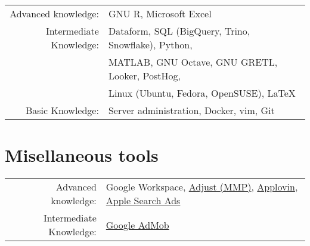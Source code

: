 \documentclass[a4paper,10pt]{article} %
\begin{document}
\begin{tabular}{rl}
    Advanced knowledge: & GNU R, Microsoft Excel\\
    Intermediate Knowledge: & Dataform, SQL (BigQuery, Trino, Snowflake), Python,
    \\&MATLAB, GNU Octave, GNU GRETL, Looker, PostHog,
    \\&Linux (Ubuntu, Fedora, OpenSUSE), \LaTeX\\
    Basic Knowledge: & Server administration, Docker, vim, Git\\
\end{tabular}

%
%
%

\section{Misellaneous tools}

\begin{tabular}{rl}
    Advanced knowledge: & Google Workspace,
    \href{https://www.adjust.com}{Adjust (MMP)},
    \href{https://www.applovin.com}{Applovin},
    \href{https://searchads.apple.com}{Apple Search Ads} \\
    Intermediate Knowledge: & \href{https://admob.google.com}{Google AdMob}
\end{tabular}
\end{document}

